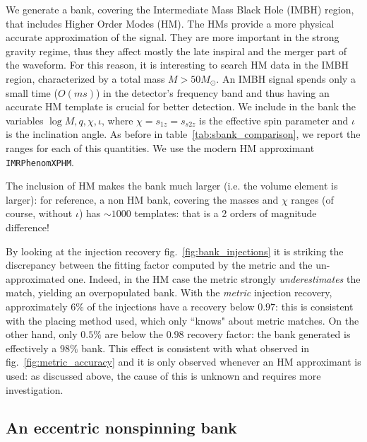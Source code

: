 \documentclass[twocolumn,showpacs,preprintnumbers,nofootinbib,prd,
superscriptaddress,10pt]{revtex4-2}
\begin{document}
We generate a bank, covering the Intermediate Mass Black Hole (IMBH) region, that includes Higher Order Modes (HM). The HMs provide a more physical accurate approximation of the signal. They are more important in the strong gravity regime, thus they affect mostly the late inspiral and the merger part of the waveform.
For this reason, it is interesting to search HM data in the IMBH region, characterized by a total mass $M>50 M_\odot$. An IMBH signal spends only a small time ($O(ms)$) in the detector's frequency band and thus having an accurate HM template is crucial for better detection.
We include in the bank the variables $\log M, q, \chi, \iota$, where $\chi=s_{1z}=s_{s2z}$ is the effective spin parameter and $\iota$ is the inclination angle.
As before in table~\ref{tab:sbank_comparison}, we report the ranges for each of this quantities. We use the modern HM approximant \texttt{IMRPhenomXPHM}.

The inclusion of HM makes the bank much larger (i.e. the volume element is larger): for reference, a non HM bank, covering the masses and $\chi$ ranges (of course, without $\iota$) has $\sim 1000$ templates: that is a 2 orders of magnitude difference!

By looking at the injection recovery fig.~\ref{fig:bank_injections} it is striking the discrepancy between the fitting factor computed by the metric and the un-approximated one. Indeed, in the HM case the metric strongly {\it underestimates} the match, yielding an overpopulated bank. With the {\it metric} injection recovery, approximately $6\%$ of the injections have a recovery below $0.97$: this is consistent with the placing method used, which only ``knows" about metric matches. On the other hand, only $0.5\%$ are below the $0.98$ recovery factor: the bank generated is effectively a $98\%$ bank.
This effect is consistent with what observed in fig.~\ref{fig:metric_accuracy} and it is only observed whenever an HM approximant is used: as discussed above, the cause of this is unknown and requires more investigation.

\subsection{An eccentric nonspinning bank}\label{sec:eccentric_bank}
\end{document}
